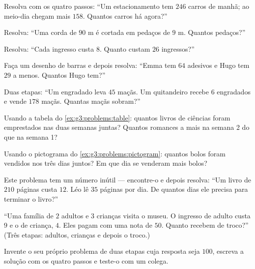 \begin{exercise}[$\star$]\label{exo:g3:problems:2}
Resolva com os quatro passos: ``Um estacionamento tem $246$ carros de
manhã; ao meio-dia chegam mais $158$. Quantos carros há agora?''
\end{exercise}

\begin{exercise}[$\star$]\label{exo:g3:problems:3}
Resolva: ``Uma corda de $90$ m é cortada em pedaços de $9$ m. Quantos
pedaços?''
\end{exercise}

\begin{exercise}[$\star$]\label{exo:g3:problems:4}
Resolva: ``Cada ingresso custa $8$. Quanto custam $26$ ingressos?''
\end{exercise}

\begin{exercise}[$\star$]\label{exo:g3:problems:5}
Faça um desenho de barras e depois resolva: ``Emma tem $64$ adesivos
e Hugo tem $29$ a menos. Quantos Hugo tem?''
\end{exercise}

\begin{exercise}[$\star$]\label{exo:g3:problems:6}
Duas etapas: ``Um engradado leva $45$ maçãs. Um quitandeiro recebe
$6$ engradados e vende $178$ maçãs. Quantas maçãs sobram?''
\end{exercise}

\begin{exercise}[$\star$]\label{exo:g3:problems:7}
Usando a tabela do \cref{ex:g3:problems:table}: quantos livros de
ciências foram emprestados nas duas semanas juntas? Quantos romances
a mais na semana 2 do que na semana 1?
\end{exercise}

\begin{exercise}[$\star$]\label{exo:g3:problems:8}
Usando o pictograma do \cref{ex:g3:problems:pictogram}: quantos
bolos foram vendidos nos três dias juntos? Em que dia se venderam
mais bolos?
\end{exercise}

\begin{exercise}[$\star$]\label{exo:g3:problems:9}
Este problema tem um número inútil --- encontre-o e depois resolva:
``Um livro de $210$ páginas custa $12$. Léo lê $35$ páginas por dia.
De quantos dias ele precisa para terminar o livro?''
\end{exercise}

\begin{exercise}[$\star\star$]\label{exo:g3:problems:10}
``Uma família de $2$ adultos e $3$ crianças visita o museu. O
ingresso de adulto custa $9$ e o de criança, $4$. Eles pagam com uma
nota de $50$. Quanto recebem de troco?'' (Três etapas: adultos,
crianças e depois o troco.)
\end{exercise}

\begin{exercise}[$\star\star$]\label{exo:g3:problems:11}
Invente o seu próprio problema de duas etapas cuja resposta seja
$100$, escreva a solução com os quatro passos e teste-o com um
colega.
\end{exercise}
